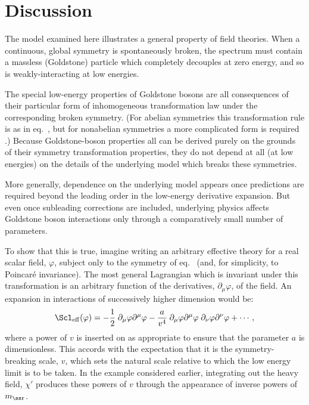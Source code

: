 \documentclass[12pt]{article}
\def\hf{{\frac12}}
\def\eq{\begin{equation}}
\def\eeq{\end{equation}}
\begin{document}
\section{Discussion}

The model examined here illustrates a general property of
field theories. When a continuous, global symmetry is
spontaneously broken, the spectrum must contain a massless
(Goldstone) particle which completely decouples at zero energy, and so
is weakly-interacting at low energies. 

The special low-energy properties of Goldstone bosons are all
consequences of their particular form of inhomogeneous transformation
law under the corresponding broken symmetry. (For abelian 
symmetries this transformation rule is as in eq.~,
but for nonabelian symmetries a more complicated form
is required \cite{ChiPT}.) Because 
Goldstone-boson properties all can be derived 
purely on the grounds of their symmetry transformation properties, 
they do not depend at all (at low energies) on the details of the 
underlying model which breaks these symmetries. 

More generally, dependence on the underlying model appears
once predictions are required beyond the leading order in the
low-energy derivative expansion. But even once subleading
corrections are included, underlying physics affects Goldstone
boson interactions only through a comparatively small number 
of parameters. 

To show that this is true, imagine writing an arbitrary effective theory for a
real scalar field, $\varphi$, subject only to the symmetry of
eq.~ (and, for simplicity, to Poincar\'e invariance).  The
most general Lagrangian which is invariant under this transformation is an
arbitrary function of the derivatives, $\partial_\mu\varphi$, of the field.
An expansion in interactions of successively higher dimension 
would be:
%
\eq
\label{abelgbaction}
\Scl_{\rm eff}(\varphi) = - \hf \; \partial_\mu \varphi 
\partial^\mu \varphi - {a \over
v^4} \;  \partial_\mu \varphi \partial^\mu \varphi \; \partial_\nu \varphi
\partial^\nu \varphi + \cdots,
\eeq
%
where a power of $v$ is inserted on as appropriate to ensure that the
parameter $a$ is dimensionless. This accords with the expectation
that it is the symmetry-breaking scale, $v$, which sets the natural scale
relative to which the low energy limit is to be taken. In the example
considered earlier, integrating out the heavy field, $\chi'$ 
produces these powers of $v$ through the appearance of 
inverse  powers of $m_\ssr$. 
\end{document}
